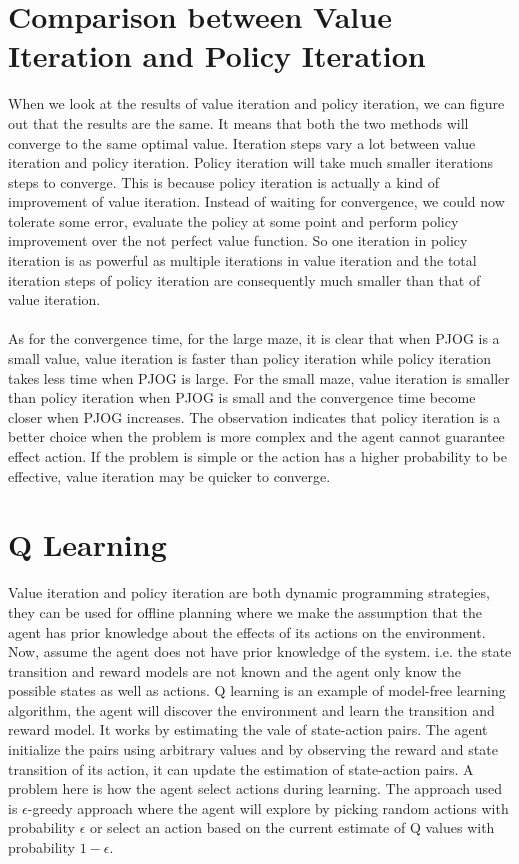 \documentclass[11pt]{article}
\begin{document}
\section{Comparison between Value Iteration and Policy Iteration}
When we look at the results of value iteration and policy iteration, we can figure out that the results are the same. It means that both the two methods will converge to the same optimal value. Iteration steps vary a lot between value iteration and policy iteration. Policy iteration will take much smaller iterations steps to converge. This is because policy iteration is actually a kind of improvement of value iteration. Instead of waiting for convergence, we could now tolerate some error, evaluate the policy at some point and perform policy improvement over the not perfect value function. So one iteration in policy iteration is as powerful as multiple iterations in value iteration and the total iteration steps of policy iteration are consequently much smaller than that of value iteration.\\
\\
As for the convergence time, for the large maze, it is clear that when PJOG is a small value, value iteration is faster than policy iteration while policy iteration takes less time when PJOG is large. For the small maze, value iteration is smaller than policy iteration when PJOG is small and the convergence time become closer when PJOG increases. The observation indicates that policy iteration is a better choice when the problem is more complex and the agent cannot guarantee effect action. If the problem is simple or the action has a higher probability to be effective, value iteration may be quicker to converge.

\section{Q Learning}
Value iteration and policy iteration are both dynamic programming strategies, they can be used for offline planning where we make the assumption that the agent has prior knowledge about the effects of its actions on the environment. Now, assume the agent does not have prior knowledge of the system. i.e. the state transition and reward models are not known and the agent only know the possible states as well as actions.  Q learning is an example of model-free learning algorithm, the agent will discover the environment and learn the transition and reward model. It works by estimating the vale of state-action pairs. The agent initialize the pairs using arbitrary values and by observing the reward and state transition of its action, it can update the estimation of state-action pairs. A problem here is how the agent select actions during learning. The approach used is $\epsilon$-greedy approach where the agent will explore by picking random actions with probability $\epsilon$ or select an action based on the current estimate of Q values with probability $1-\epsilon$.
\end{document}
